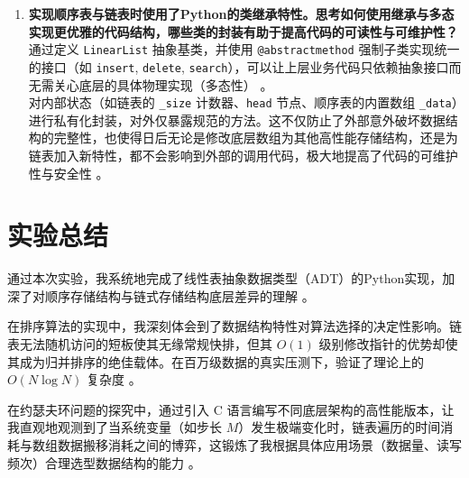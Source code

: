 \documentclass[12pt,a4paper]{ctexart}
\begin{document}
\begin{enumerate}
		\item \textbf{实现顺序表与链表时使用了Python的类继承特性。思考如何使用继承与多态实现更优雅的代码结构，哪些类的封装有助于提高代码的可读性与可维护性？}\\
		通过定义 \texttt{LinearList} 抽象基类，并使用 \texttt{@abstractmethod} 强制子类实现统一的接口（如 \texttt{insert}, \texttt{delete}, \texttt{search}），可以让上层业务代码只依赖抽象接口而无需关心底层的具体物理实现（多态性） 。\\
		对内部状态（如链表的 \texttt{\_size} 计数器、\texttt{head} 节点、顺序表的内置数组 \texttt{\_data}）进行私有化封装，对外仅暴露规范的方法。这不仅防止了外部意外破坏数据结构的完整性，也使得日后无论是修改底层数组为其他高性能存储结构，还是为链表加入新特性，都不会影响到外部的调用代码，极大地提高了代码的可维护性与安全性 。
	\end{enumerate}
	
	\section{实验总结}
	通过本次实验，我系统地完成了线性表抽象数据类型（ADT）的Python实现，加深了对顺序存储结构与链式存储结构底层差异的理解 。
	
	在排序算法的实现中，我深刻体会到了数据结构特性对算法选择的决定性影响。链表无法随机访问的短板使其无缘常规快排，但其 $O(1)$ 级别修改指针的优势却使其成为归并排序的绝佳载体。在百万级数据的真实压测下，验证了理论上的 $O(N \log N)$ 复杂度 。
	
	在约瑟夫环问题的探究中，通过引入 C 语言编写不同底层架构的高性能版本，让我直观地观测到了当系统变量（如步长 $M$）发生极端变化时，链表遍历的时间消耗与数组数据搬移消耗之间的博弈，这锻炼了我根据具体应用场景（数据量、读写频次）合理选型数据结构的能力 。
	
\end{document}
